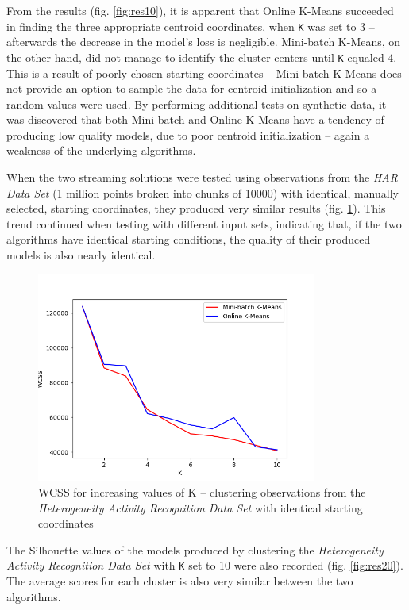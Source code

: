 \documentclass{l4proj}
\begin{document}
From the results (fig. \ref{fig:res10}), it is apparent that Online K-Means succeeded in finding the three appropriate centroid coordinates, when \texttt{K} was set to 3 -- afterwards the decrease in the model's loss is negligible. Mini-batch K-Means, on the other hand, did not manage to identify the cluster centers until \texttt{K} equaled 4. This is a result of poorly chosen starting coordinates -- Mini-batch K-Means does not provide an option to sample the data for centroid initialization and so a random values were used. By performing additional tests on synthetic data, it was discovered that both Mini-batch and Online K-Means have a tendency of producing low quality models, due to poor centroid initialization -- again a weakness of the underlying algorithms.

When the two streaming solutions were tested using observations from the  \textit{HAR Data Set} (1 million points broken into chunks of 10000) with identical, manually selected, starting coordinates, they produced very similar results (fig. \ref{fig:res11}). This trend continued when testing with different input sets, indicating that, if the two algorithms have identical starting conditions, the quality of their produced models is also nearly identical.

\begin{figure}[H]
	\centering
    \includegraphics[width=0.82\textwidth]{images/result11}
    \caption{WCSS for increasing values of K -- clustering observations from the \textit{Heterogeneity Activity Recognition Data Set} with identical starting coordinates} 
    \label{fig:res11}
\end{figure}

The Silhouette values of the models produced by clustering the \textit{Heterogeneity Activity Recognition Data Set} with \texttt{K} set to 10 were also recorded (fig. \ref{fig:res20}). The average scores for each cluster is also very similar between the two algorithms.
\end{document}
